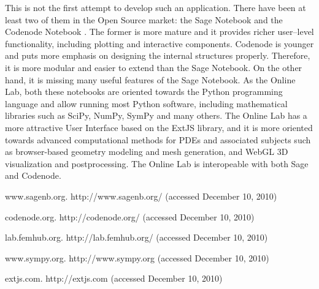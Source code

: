 This is not the first attempt to develop such an application. There have been at least two of them in the Open Source market: the Sage Notebook \cite{SageNotebook} and the Codenode Notebook \cite{CodenodeNotebook}. The former is more mature and it provides richer user--level functionality, including plotting and interactive components. Codenode is younger and puts more emphasis on designing the internal structures properly. Therefore, it is more modular and easier to extend than the Sage Notebook. On the other hand, it is missing many useful features of the Sage Notebook. As the Online Lab, both these notebooks are oriented towards the Python programming language and allow running most Python software, including mathematical libraries such as SciPy, NumPy, SymPy and many others. The Online Lab has a more attractive User Interface based on the ExtJS library, and it is more oriented towards advanced computational methods for PDEs and associated subjects such as browser-based geometry modeling and mesh generation, and WebGL 3D visualization and postprocessing. The Online Lab is interopeable with both Sage and Codenode. 


\begin{thebibliography}{10}
{\sc www.sagenb.org}. {http://www.sagenb.org/} (accessed December 10, 2010)

{\sc codenode.org}. {http://codenode.org/} (accessed December 10, 2010)

{\sc lab.femhub.org}. {http://lab.femhub.org/} (accessed December 10, 2010)

{\sc www.sympy.org}. {http://www.sympy.org} (accessed December 10, 2010)

{\sc extjs.com}. {http://extjs.com} (accessed December 10, 2010)
\end{thebibliography}
